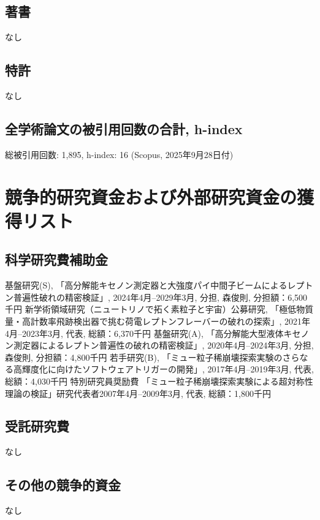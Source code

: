 \vspace{-8mm}
\subsection{著書}
\vspace{-3mm}
なし
\vspace{-8mm}
\subsection{特許}
\vspace{-3mm}
なし
\vspace{-4mm}

\subsection{全学術論文の被引用回数の合計, h-index}
\noindent
総被引用回数: 1,895, h-index: 16 (Scopus, 2025年9月28日付)

\newpage



\section{競争的研究資金および外部研究資金の獲得リスト}
\subsection{科学研究費補助金}
\begin{enumerate}
\setcounter{enumi}{61}
	\setlength{\itemsep}{-1pt}

 基盤研究(S), 「高分解能キセノン測定器と大強度パイ中間子ビームによるレプトン普遍性破れの精密検証」, 2024年4月--2029年3月, 分担, 森俊則, 分担額：6,500千円
 新学術領域研究（ニュートリノで拓く素粒子と宇宙）公募研究, 「極低物質量・高計数率飛跡検出器で挑む荷電レプトンフレーバーの破れの探索」, 2021年4月--2023年3月, 代表, 総額：6,370千円
 基盤研究(A), 「高分解能大型液体キセノン測定器によるレプトン普遍性の破れの精密検証」, 2020年4月--2024年3月, 分担, 森俊則, 分担額：4,800千円
 若手研究(B),  「ミュー粒子稀崩壊探索実験のさらなる高輝度化に向けたソフトウェアトリガーの開発」, 2017年4月--2019年3月, 代表, 総額：4,030千円
 特別研究員奨励費 「ミュー粒子稀崩壊探索実験による超対称性理論の検証」研究代表者2007年4月--2009年3月, 代表, 総額：1,800千円
\end{enumerate}

\subsection{受託研究費}
なし
\subsection{その他の競争的資金}
なし
